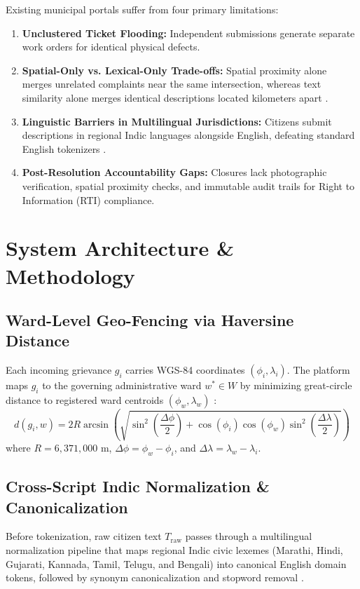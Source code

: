 \documentclass[conference]{IEEEtran}
\begin{document}
Existing municipal portals suffer from four primary limitations:
\begin{enumerate}
    \item \textbf{Unclustered Ticket Flooding:} Independent submissions generate separate work orders for identical physical defects.
    \item \textbf{Spatial-Only vs. Lexical-Only Trade-offs:} Spatial proximity alone merges unrelated complaints near the same intersection, whereas text similarity alone merges identical descriptions located kilometers apart \cite{elmagarmid2007duplicate}.
    \item \textbf{Linguistic Barriers in Multilingual Jurisdictions:} Citizens submit descriptions in regional Indic languages alongside English, defeating standard English tokenizers \cite{kakwani2020indicnlpsuite}.
    \item \textbf{Post-Resolution Accountability Gaps:} Closures lack photographic verification, spatial proximity checks, and immutable audit trails for Right to Information (RTI) compliance.
\end{enumerate}

\section{System Architecture \& Methodology}

\subsection{Ward-Level Geo-Fencing via Haversine Distance}
Each incoming grievance $g_i$ carries WGS-84 coordinates $(\phi_i, \lambda_i)$. The platform maps $g_i$ to the governing administrative ward $w^* \in W$ by minimizing great-circle distance to registered ward centroids $(\phi_w, \lambda_w)$ \cite{sinnott1984virtues}:
\begin{equation}
d(g_i, w) = 2R \arcsin\left(\sqrt{\sin^2\left(\frac{\Delta\phi}{2}\right) + \cos(\phi_i)\cos(\phi_w)\sin^2\left(\frac{\Delta\lambda}{2}\right)}\right)
\end{equation}
where $R = 6,371,000\text{ m}$, $\Delta\phi = \phi_w - \phi_i$, and $\Delta\lambda = \lambda_w - \lambda_i$.

\subsection{Cross-Script Indic Normalization \& Canonicalization}
Before tokenization, raw citizen text $T_{\text{raw}}$ passes through a multilingual normalization pipeline that maps regional Indic civic lexemes (Marathi, Hindi, Gujarati, Kannada, Tamil, Telugu, and Bengali) into canonical English domain tokens, followed by synonym canonicalization and stopword removal \cite{bird2009natural}.
\end{document}
